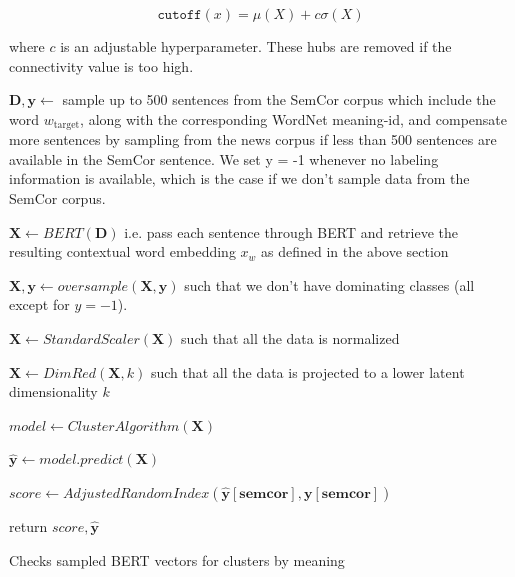 \documentclass[a4paper,12pt,oneside,openright]{report}
\begin{document}
\begin{equation}
\texttt{cutoff}(x) = \mu ( X ) + c \sigma (X)
\end{equation}

where $c$ is an adjustable hyperparameter.
These hubs are removed if the connectivity value is too high. \\

\begin{algorithm}[H]
\SetAlgoLined
{}

 $\mathbf{D}, \mathbf{y} \leftarrow $  sample up to 500 sentences from the SemCor corpus which include the word $w_{\text{target}}$, along with the corresponding WordNet meaning-id, and compensate more sentences by sampling from the news corpus if less than 500 sentences are available in the SemCor sentence.
We set y = -1 whenever no labeling information is available, which is the case if we don't sample data from the SemCor corpus.\;

$ \mathbf{X} \leftarrow BERT( \mathbf{D} )$ i.e. pass each sentence through BERT and retrieve the resulting contextual word embedding $x_w$ as defined in the above section\;
 
$ \mathbf{X}, \mathbf{y} \leftarrow oversample( \mathbf{X}, \mathbf{y} )$ such that we don't have dominating classes (all except for $y = -1$).\;
 
$ \mathbf{X} \leftarrow StandardScaler( \mathbf{X})$ such that all the data is normalized\;

$ \mathbf{X} \leftarrow DimRed( \mathbf{X}, k )$ such that all the data is projected to a lower latent dimensionality $k$\;

$ model \leftarrow ClusterAlgorithm( \mathbf{X})$ \;

$ \mathbf{\hat{y}} \leftarrow model.predict(\mathbf{X}) $ \;

$ score \leftarrow AdjustedRandomIndex(\mathbf{\hat{y}[semcor]}, \mathbf{y[semcor]}) $ \;

return $ score, \mathbf{\hat{y}}$\;
    
 \caption{Checks sampled BERT vectors for clusters by  meaning}
\end{algorithm}
\end{document}
